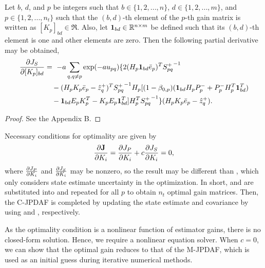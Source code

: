\begin{prop}
Let $b$, $d$, and $p$ be integers such that $b\in\{1,2,...,n\}$,  $d\in\{1,2,...,m\}$, and $p\in\{1,2,...,n_t\}$ such that the $(b,d)$-th element of the $p$-th gain matrix is written as $[K_p]_{bd}\in\Re$.
Also, let $\mathbf{1}_{bd}\in \mathbb{R}^{n\times m}$ be defined such that its $(b,d)$-th element is one and other elements are zero.
Then the following partial derivative may be obtained,
\begin{align*}
\frac{\partial J_S}{\partial [K_p]_{bd}}&=\ -a\sum\limits_{q,q\neq p}\exp (-au_{pq})
\{
2(H_p\mathbf{1}_{bd}{\bar{e}}_p)^T
{S_{pq}^+}^{-1}
\nonumber
\\
& \quad
-(H_pK_p{\bar{e}}_p-\hat z^+_{q})^T
{S^+_{pq}}^{-1}
H_p
[(1-\beta_{0,p})(\mathbf{1}_{bd} H_pP_p^-
+P_p^-H_p^T\mathbf{1}_{bd}^T)
\nonumber
\\
& \quad
-\mathbf{1}_{bd} E_pK_p^T-K_pE_p\mathbf{1}_{bd}^T]
H_p^T
{S^+_{pq}}^{-1}
\}(H_pK_p{\bar{e}}_p-\hat z^+_{q}).
\end{align*}
\end{prop}
\begin{proof}
See the Appendix B.
\end{proof}


Necessary conditions for optimality are given by
\begin{align}
\frac{\partial \mathbf{J}}{\partial K_i} = \frac{\partial J_P}{\partial K_i} + c \frac{\partial J_S}{\partial K_i} =0,\label{eqn:NCO}
\end{align}
where $\frac{\partial J_P}{\partial K_i}$ and $\frac{\partial J_S}{\partial K_i}$ may be nonzero, so the result may be different than , which only considers state estimate uncertainty in the optimization.
In short,  and  are substituted into  and repeated for all $p$ to obtain $n_t$ optimal gain matrices.
Then, the C-JPDAF is completed by updating the state estimate and covariance by using  and , respectively.


As the optimality condition is a nonlinear function of estimator gains, there is no closed-form solution.
Hence, we require a nonlinear equation solver.
When $c=0$, we can show that the optimal gain reduces to that of the M-JPDAF, which is used as an initial guess during iterative numerical methods.





